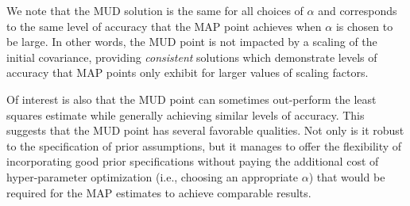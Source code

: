 
We note that the MUD solution is the same for all choices of $\alpha$ and corresponds to the same level of accuracy that the MAP point achieves when $\alpha$ is chosen to be large.
In other words, the MUD point is not impacted by a scaling of the initial covariance, providing \emph{consistent} solutions which demonstrate levels of accuracy that MAP points only exhibit for larger values of scaling factors.

Of interest is also that the MUD point can sometimes out-perform the least squares estimate while generally achieving similar levels of accuracy.
This suggests that the MUD point has several favorable qualities.
Not only is it robust to the specification of prior assumptions, but it manages to offer the flexibility of incorporating good prior specifications without paying the additional cost of hyper-parameter optimization (i.e., choosing an appropriate $\alpha$) that would be required for the MAP estimates to achieve comparable results.

